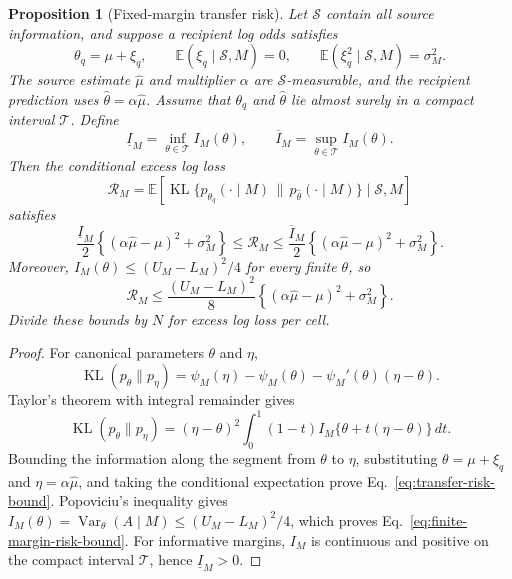 \documentclass[10pt,a4paper]{article}
\newtheorem{proposition}{Proposition}
\newcommand{\E}{\mathbb{E}}
\begin{document}
\begin{proposition}[Fixed-margin transfer risk]
Let $\mathcal S$ contain all source information, and suppose a recipient log odds satisfies
\[
  \theta_q=\mu+\xi_q,
  \qquad
  \E(\xi_q\mid\mathcal S,M)=0,
  \qquad
  \E(\xi_q^2\mid\mathcal S,M)=\sigma_M^2.
\]
The source estimate $\widehat\mu$ and multiplier $\alpha$ are $\mathcal S$-measurable, and the recipient prediction uses $\widehat\theta=\alpha\widehat\mu$. Assume that $\theta_q$ and $\widehat\theta$ lie almost surely in a compact interval $\mathcal T$. Define
\[
  \underline I_M=\inf_{\theta\in\mathcal T}I_M(\theta),
  \qquad
  \overline I_M=\sup_{\theta\in\mathcal T}I_M(\theta).
\]
Then the conditional excess log loss
\[
  \mathcal R_M=
  \E\!\left[
    \operatorname{KL}\{p_{\theta_q}(\cdot\mid M)\,\|\,
    p_{\widehat\theta}(\cdot\mid M)\}
    \mid\mathcal S,M
  \right]
\]
satisfies
\begin{equation}
  \frac{\underline I_M}{2}
  \left\{(\alpha\widehat\mu-\mu)^2+\sigma_M^2\right\}
  \leq \mathcal R_M \leq
  \frac{\overline I_M}{2}
  \left\{(\alpha\widehat\mu-\mu)^2+\sigma_M^2\right\}.
  \label{eq:transfer-risk-bound}
\end{equation}
Moreover, $I_M(\theta)\leq(U_M-L_M)^2/4$ for every finite $\theta$, so
\begin{equation}
  \mathcal R_M\leq
  \frac{(U_M-L_M)^2}{8}
  \left\{(\alpha\widehat\mu-\mu)^2+\sigma_M^2\right\}.
  \label{eq:finite-margin-risk-bound}
\end{equation}
Divide these bounds by $N$ for excess log loss per cell.
\end{proposition}

\begin{proof}
For canonical parameters $\theta$ and $\eta$,
\[
  \operatorname{KL}(p_\theta\|p_\eta)
  =\psi_M(\eta)-\psi_M(\theta)-\psi_M'(\theta)(\eta-\theta).
\]
Taylor's theorem with integral remainder gives
\[
  \operatorname{KL}(p_\theta\|p_\eta)
  =(\eta-\theta)^2\int_0^1(1-t)
  I_M\{\theta+t(\eta-\theta)\}\,dt.
\]
Bounding the information along the segment from $\theta$ to $\eta$, substituting $\theta=\mu+\xi_q$ and $\eta=\alpha\widehat\mu$, and taking the conditional expectation prove Eq.~\eqref{eq:transfer-risk-bound}. Popoviciu's inequality gives $I_M(\theta)=\operatorname{Var}_\theta(A\mid M)\leq(U_M-L_M)^2/4$, which proves Eq.~\eqref{eq:finite-margin-risk-bound}. For informative margins, $I_M$ is continuous and positive on the compact interval $\mathcal T$, hence $\underline I_M>0$.
\end{proof}
\end{document}
